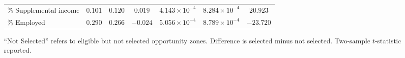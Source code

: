 \begin{table}[tbh]
\begin{threeparttable}
\begin{tabular}{lcccccc}
\% Supplemental income  &                                                                                     $0.101$ &                                                                                     $0.120$ &                                                                                     $0.019$ &                                                                      $4.143 \times 10^{-4}$ &                                                                      $8.284 \times 10^{-4}$ &                                                                                    $20.923$ \\
\% Employed             &                                                                                     $0.290$ &                                                                                     $0.266$ &                                                                                    $-0.024$ &                                                                      $5.056 \times 10^{-4}$ &                                                                      $8.789 \times 10^{-4}$ &                                                                                   $-23.720$ \\
\bottomrule
\end{tabular}

        \begin{tablenotes}
        \footnotesize
        \item     ``Not Selected'' refers to eligible but not selected opportunity zones.
    Difference is selected minus not selected. Two-sample $t$-statistic reported.
        \end{tablenotes}
        \end{threeparttable}

        \end{table}
        